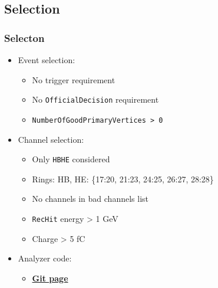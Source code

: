 \documentclass[bigger]{beamer}
\providecommand{\alert}[1]{\textbf{#1}}
\begin{document}
\subsection{Selection}
\label{sec-2-3}
\begin{frame}
\frametitle{Selecton}
\label{sec-2-3-1}
\begin{itemize}

\item Event selection:
\label{sec-2-3-1-1}%
\begin{itemize}

\item No trigger requirement
\label{sec-2-3-1-1-1}%

\item No \texttt{OfficialDecision} requirement
\label{sec-2-3-1-1-2}%

\item \texttt{NumberOfGoodPrimaryVertices > 0}
\label{sec-2-3-1-1-3}%
\end{itemize} %

\item Channel selection:
\label{sec-2-3-1-2}%
\begin{itemize}

\item Only \texttt{HBHE} considered
\label{sec-2-3-1-2-1}%

\item Rings: HB, HE: \{17:20, 21:23, 24:25, 26:27, 28:28\}
\label{sec-2-3-1-2-2}%

\item No channels in bad channels list
\label{sec-2-3-1-2-3}%

\item \texttt{RecHit} energy > 1 GeV
\label{sec-2-3-1-2-4}%

\item Charge > 5 fC
\label{sec-2-3-1-2-5}%
\end{itemize} %

\item Analyzer code:
\label{sec-2-3-1-3}%
\begin{itemize}

\item \href{https://github.com/edmundaberry/HcalReco/blob/master/analysis/macros/analysisClass_hcalReco.C}{\alert{Git page}}
\label{sec-2-3-1-3-1}%
\end{itemize} %
\end{itemize} %
\end{frame}
\end{document}
